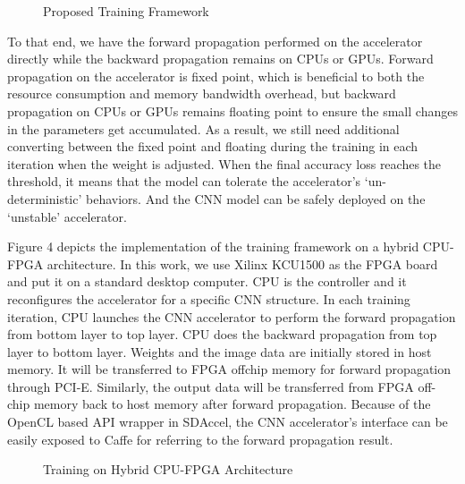 \begin{figure}
        \caption{Proposed Training Framework}
        \label{fig:retrain}
\end{figure}


  To that end, we have the forward propagation performed on the accelerator 
directly while the backward propagation remains on CPUs or GPUs. Forward propagation 
on the accelerator is fixed point, which is beneficial to both the resource consumption 
and memory bandwidth overhead, but backward propagation on CPUs or GPUs remains floating 
point to ensure the small changes in the parameters get accumulated\cite{Matthieu2014_8}. As a result, 
we still need additional converting between the fixed point and floating during 
the training in each iteration when the weight is adjusted. When the final accuracy 
loss reaches the threshold, it means that the model can tolerate 
the accelerator’s ‘un-deterministic’ behaviors. And the CNN model can be safely 
deployed on the ‘unstable’ accelerator. 

Figure 4 depicts the implementation of the training framework on a hybrid 
CPU-FPGA architecture. In this work, we use Xilinx KCU1500 as the FPGA board 
and put it on a standard desktop computer. CPU is the controller and it reconfigures 
the accelerator for a specific CNN structure. In each training iteration, CPU launches 
the CNN accelerator to perform the forward propagation from bottom layer to top layer. 
CPU does the backward propagation from top layer to bottom layer. Weights and the image 
data are initially stored in host memory. It will be transferred to FPGA offchip memory 
for forward propagation through PCI-E. Similarly, the output data will be transferred 
from FPGA off-chip memory back to host memory after forward propagation. Because of the 
OpenCL based API wrapper in SDAccel, the CNN accelerator’s interface can be easily 
exposed to Caffe for referring to the forward propagation result. 

\begin{figure}
        \caption{Training on Hybrid CPU-FPGA Architecture}
        \label{fig:framework}
        \vspace{-1em}
\end{figure}


